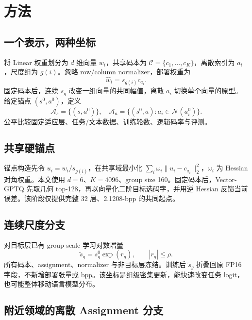 \section{方法}

\subsection{一个表示，两种坐标}

将 Linear 权重划分为 $d$ 维向量 $w_i$，共享码本为 $\mathcal C=\{c_1,\ldots,c_K\}$，离散索引为 $a_i$，尺度组为 $g(i)$。忽略 row/column normalizer，部署权重为
\begin{equation}
\hat w_i=s_{g(i)}c_{a_i}.
\end{equation}
固定码本后，连续 $s_g$ 改变一组向量的共同幅值，离散 $a_i$ 切换单个向量的原型。给定锚点 $(s^0,a^0)$，定义
\begin{equation}
\mathcal A_s=\{(s,a^0)\},\quad
\mathcal A_a=\{(s^0,a):a_i\in\mathcal N(a_i^0)\}.
\end{equation}
公平比较固定适应层、任务/文本数据、训练轮数、逻辑码率与评测。

\subsection{共享硬锚点}

锚点构造先令 $u_i=w_i/s_{g(i)}$，在共享域最小化 $\sum_i\omega_i\|u_i-c_{a_i}\|_2^2$，$\omega_i$ 为 Hessian 对角权重。本文使用 $d=6$、$K=4096$、group size 160。固定码本后，Vector-GPTQ 先取几何 top-128，再以向量化二阶目标选码字，并用逆 Hessian 反馈当前误差。该阶段仅提供完整 32 层、2.1208-bpp 的共同起点。

\subsection{连续尺度分支}

对目标层已有 group scale 学习对数增量
\begin{equation}
\tilde s_g=s_g^0\exp(r_g),\qquad |r_g|\le\rho.
\end{equation}
所有码本、assignment、normalizer 与非目标层冻结。训练后 $\tilde s_g$ 折叠回原 FP16 字段，不新增部署张量或 bpp。该坐标是组级密集更新，能快速改变任务 logit，也可能整体移动语言模型分布。

\subsection{附近领域的离散 Assignment 分支}

